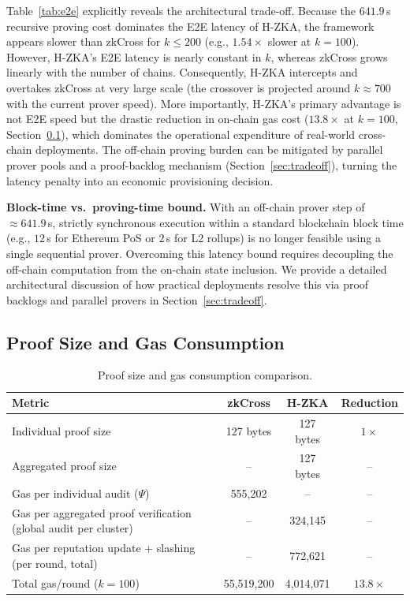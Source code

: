 \documentclass[journal]{IEEEtran}
\begin{document}
Table~\ref{tab:e2e} explicitly reveals the architectural trade-off. Because the $641.9$\,s recursive proving cost dominates the E2E latency of H-ZKA, the framework appears slower than zkCross for $k\le 200$ (e.g., $1.54\times$ slower at $k=100$). However, H-ZKA's E2E latency is nearly constant in $k$, whereas zkCross grows linearly with the number of chains. Consequently, H-ZKA intercepts and overtakes zkCross at very large scale (the crossover is projected around $k \approx 700$ with the current prover speed). More importantly, H-ZKA's primary advantage is not E2E speed but the drastic reduction in on-chain gas cost ($13.8\times$ at $k=100$, Section~\ref{sec:gas}), which dominates the operational expenditure of real-world cross-chain deployments. The off-chain proving burden can be mitigated by parallel prover pools and a proof-backlog mechanism (Section~\ref{sec:tradeoff}), turning the latency penalty into an economic provisioning decision.

\textbf{Block-time vs.\ proving-time bound.} With an off-chain prover step of $\approx 641.9\,$s, strictly synchronous execution within a standard blockchain block time (e.g., $12\,$s for Ethereum PoS or $2\,$s for L2 rollups) is no longer feasible using a single sequential prover. Overcoming this latency bound requires decoupling the off-chain computation from the on-chain state inclusion. We provide a detailed architectural discussion of how practical deployments resolve this via proof backlogs and parallel provers in Section~\ref{sec:tradeoff}.

\subsection{Proof Size and Gas Consumption}
\label{sec:gas}

\begin{table}[t]
\centering
\caption{Proof size and gas consumption comparison.}
\label{tab:gas}
\begin{tabular}{lccc}
\toprule
Metric & zkCross & H-ZKA & Reduction \\
\midrule
Individual proof size & 127 bytes & 127 bytes & $1\times$ \\
Aggregated proof size & -- & 127 bytes & -- \\
Gas per individual audit ($\Psi$) & 555,202 & -- & -- \\
Gas per aggregated proof verification (global audit per cluster) & -- & 324,145 & -- \\
Gas per reputation update + slashing (per round, total) & -- & 772,621 & -- \\
Total gas/round ($k=100$) & 55,519,200 & 4,014,071 & $13.8\times$ \\
\bottomrule
\end{tabular}
\end{table}
\end{document}
